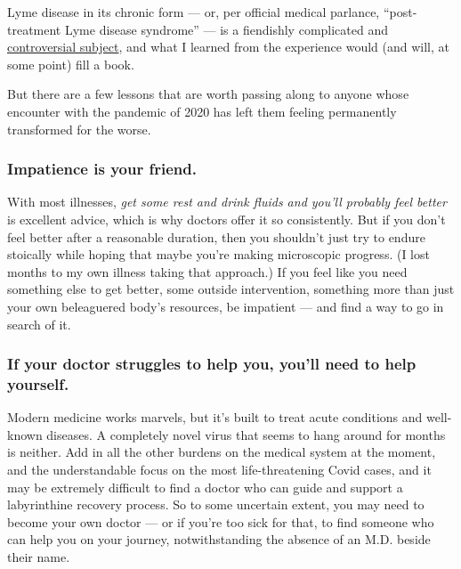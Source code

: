 Lyme disease in its chronic form --- or, per official medical parlance,
``post-treatment Lyme disease syndrome'' --- is a fiendishly complicated
and
\href{https://www.newyorker.com/magazine/2013/07/01/the-lyme-wars}{controversial
subject}, and what I learned from the experience would (and will, at
some point) fill a book.

But there are a few lessons that are worth passing along to anyone whose
encounter with the pandemic of 2020 has left them feeling permanently
transformed for the worse.

\hypertarget{impatience-is-your-friend}{%
\subsubsection{\texorpdfstring{\textbf{Impatience is your
friend.}}{Impatience is your friend.}}\label{impatience-is-your-friend}}

With most illnesses, \emph{get some rest and drink fluids and you'll
probably feel better} is excellent advice, which is why doctors offer it
so consistently. But if you don't feel better after a reasonable
duration, then you shouldn't just try to endure stoically while hoping
that maybe you're making microscopic progress. (I lost months to my own
illness taking that approach.) If you feel like you need something else
to get better, some outside intervention, something more than just your
own beleaguered body's resources, be impatient --- and find a way to go
in search of it.

\hypertarget{if-your-doctor-struggles-to-help-you-youll-need-to-help-yourself}{%
\subsubsection{\texorpdfstring{\textbf{If your doctor struggles to help
you, you'll need to help
yourself.}}{If your doctor struggles to help you, you'll need to help yourself.}}\label{if-your-doctor-struggles-to-help-you-youll-need-to-help-yourself}}

Modern medicine works marvels, but it's built to treat acute conditions
and well-known diseases. A completely novel virus that seems to hang
around for months is neither. Add in all the other burdens on the
medical system at the moment, and the understandable focus on the most
life-threatening Covid cases, and it may be extremely difficult to find
a doctor who can guide and support a labyrinthine recovery process. So
to some uncertain extent, you may need to become your own doctor --- or
if you're too sick for that, to find someone who can help you on your
journey, notwithstanding the absence of an M.D. beside their name.

